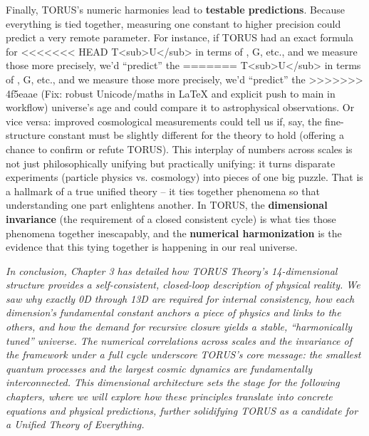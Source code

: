 \documentclass[]{article}
\begin{document}
Finally, TORUS's numeric harmonies lead to \textbf{testable
predictions}. Because everything is tied together, measuring one
constant to higher precision could predict a very remote parameter. For
instance, if TORUS had an exact formula for
<<<<<<< HEAD
T\textless sub\textgreater U\textless/sub\textgreater{} in terms of \alpha,
G, etc., and we measure those more precisely, we'd ``predict'' the
=======
T\textless{}sub\textgreater{}U\textless{}/sub\textgreater{} in terms of
\alpha, G, etc., and we measure those more precisely, we'd ``predict'' the
>>>>>>> 4f5eaae (Fix: robust Unicode/maths in LaTeX and explicit push to main in workflow)
universe's age and could compare it to astrophysical observations. Or
vice versa: improved cosmological measurements could tell us if, say,
the fine-structure constant must be slightly different for the theory to
hold (offering a chance to confirm or refute TORUS). This interplay of
numbers across scales is not just philosophically unifying but
practically unifying: it turns disparate experiments (particle physics
vs. cosmology) into pieces of one big puzzle. That is a hallmark of a
true unified theory -- it ties together phenomena so that understanding
one part enlightens another. In TORUS, the \textbf{dimensional
invariance} (the requirement of a closed consistent cycle) is what ties
those phenomena together inescapably, and the \textbf{numerical
harmonization} is the evidence that this tying together is happening in
our real universe​.

\emph{In conclusion, Chapter 3 has detailed how TORUS Theory's
14-dimensional structure provides a self-consistent, closed-loop
description of physical reality. We saw why exactly 0D through 13D are
required for internal consistency, how each dimension's fundamental
constant anchors a piece of physics and links to the others, and how the
demand for recursive closure yields a stable, ``harmonically tuned''
universe. The numerical correlations across scales and the invariance of
the framework under a full cycle underscore TORUS's core message: the
smallest quantum processes and the largest cosmic dynamics are
fundamentally interconnected. This dimensional architecture sets the
stage for the following chapters, where we will explore how these
principles translate into concrete equations and physical predictions,
further solidifying TORUS as a candidate for a Unified Theory of
Everything.}
\end{document}
